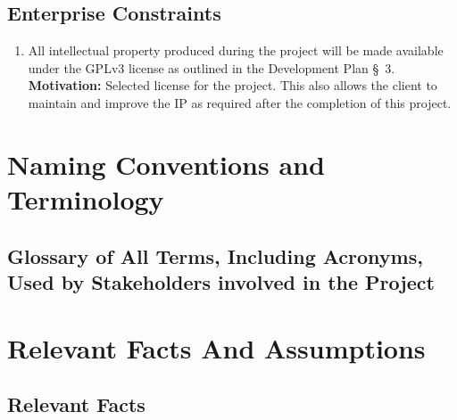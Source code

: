\documentclass[12pt]{article}
\begin{document}
\subsection{Enterprise Constraints}
\begin{enumerate}[align=left,
  leftmargin=*,
  labelsep=1em,
  itemindent=0em,
  label=\bfseries EPC-\arabic*:]
  \item All intellectual property produced during the project will be made available under the GPLv3 license as
    outlined in the Development Plan \S \ 3.\\[2mm]
    {\bf Motivation:} Selected license for the project. This also allows the client to maintain and improve the
    IP as required after the completion of this project.
\end{enumerate}

\section{Naming Conventions and Terminology}
\subsection{Glossary of All Terms, Including Acronyms, Used by Stakeholders
involved in the Project}
\label{SRS:glossary}
\glsaddall
\printnoidxglossaries

\section{Relevant Facts And Assumptions}

\subsection{Relevant Facts}
\end{document}
